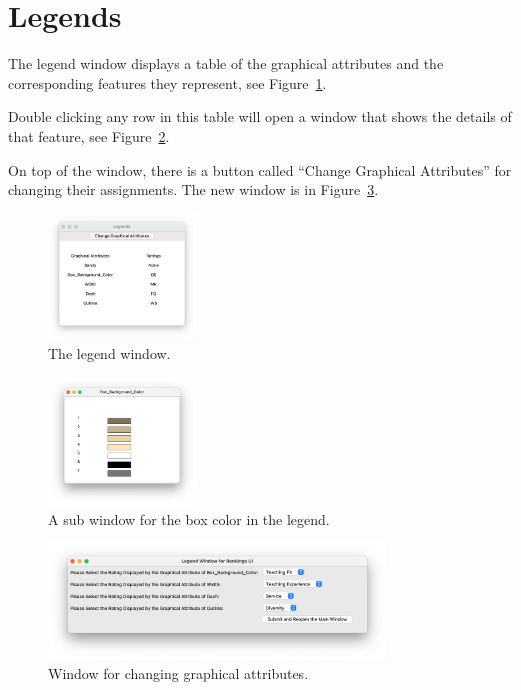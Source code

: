 \documentclass[a4paper,11pt]{memoir}
\begin{document}
\section{Legends}
The legend window displays a table of the graphical attributes and the corresponding features they represent,
see Figure~\ref{fig:legend}.

Double clicking any row in this table will open a window that shows the details of that feature,
see Figure~\ref{fig:legend_sub}.

On top of the window, there is a button called ``Change Graphical Attributes'' for changing their assignments.
The new window is in Figure~\ref{fig:legend_change}.


  \begin{figure}[h]
    \begin{center}
      \includegraphics[width=0.35\textwidth]{art/legend.png}
      \caption{The legend window.}\label{fig:legend}
    \end{center}
  \end{figure}


  \begin{figure}[h]
    \begin{center}
      \includegraphics[width=0.35\textwidth]{art/legend_sub.png}
      \caption{A sub window for the box color in the legend.}\label{fig:legend_sub}
    \end{center}
  \end{figure}

  \begin{figure}[h]
    \begin{center}
      \includegraphics[width=0.8\textwidth]{art/legend_change.png}
      \caption{Window for changing graphical attributes.}\label{fig:legend_change}
    \end{center}
  \end{figure}
\end{document}
